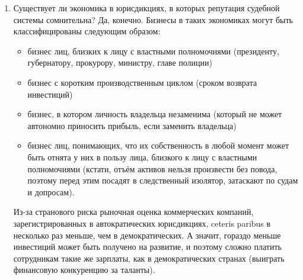 \documentclass[11pt]{article}
\theoremstyle{remark}
\theoremstyle{definition}
\begin{document}
\begin{enumerate}

\item Существует ли экономика в юрисдикциях, в которых репутация судебной системы сомнительна? Да, конечно. Бизнесы в таких экономиках могут быть классифицированы следующим образом:

\begin{itemize}
\item бизнес лиц, близких к лицу с властными полномочиями (президенту, губернатору, прокурору, министру, главе полиции)
\item бизнес с коротким производственным циклом (сроком возврата инвестиций)
\item бизнес, в котором личность владельца незаменима (который не может автономно приносить прибыль, если заменить владельца)
\item бизнес лиц, понимающих, что их собственность в любой момент может быть отнята у них в пользу лица, близкого к лицу с властными полномочиями (кстати, отъём активов нельзя произвести без повода, поэтому перед этим посадят в следственный изолятор, затаскают по судам и допросам).
\end{itemize}


Из-за странового риска рыночная оценка коммерческих компаний, зарегистрированных в автократических юрисдикциях, ceteris paribus в несколько раз меньше, чем в демократических. А значит, гораздо меньше инвестиций может быть получено на развитие, и поэтому сложно платить сотрудникам такие же зарплаты, как в демократических странах (выиграть финансовую конкуренцию за таланты).










\end{enumerate}
\end{document}
